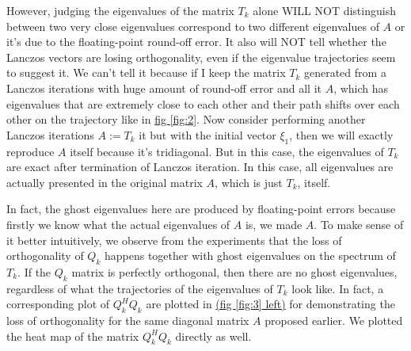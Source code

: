 \documentclass[]{article}
\theoremstyle{definition}
\begin{document}
            \par
            However, judging the eigenvalues of the matrix $T_k$ alone WILL NOT distinguish between two very close eigenvalues correspond to two different eigenvalues of $A$ or it's due to the floating-point round-off error. It also will NOT tell whether the Lanczos vectors are losing orthogonality, even if the eigenvalue trajectories seem to suggest it. We can't tell it because if I keep the matrix $T_k$ generated from a Lanczos iterations with huge amount of round-off error and all it $A$, which has eigenvalues that are extremely close to each other and their path shifts over each other on the trajectory like in \hyperref[fig:2]{fig \ref*{fig:2}}. Now consider performing another Lanczos iterations $A:=T_k$ it but with the initial vector $\xi_1$, then we will exactly reproduce $A$ itself because it's tridiagonal. But in this case, the eigenvalues of $T_k$ are exact after termination of Lanczos iteration. In this case, all eigenvalues are actually presented in the original matrix $A$, which is just $T_k$, itself. 
            \par
            In fact, the ghost eigenvalues here are produced by floating-point errors because firstly we know what the actual eigenvalues of $A$ is, we made $A$. To make sense of it better intuitively, we observe from the experiments that the loss of orthogonality of $Q_k$ happens together with ghost eigenvalues on the spectrum of $T_k$. If the $Q_k$ matrix is perfectly orthogonal, then there are no ghost eigenvalues, regardless of what the trajectories of the eigenvalues of $T_k$ look like. In fact, a corresponding plot of $Q_k^HQ_k$ are plotted in \hyperref[fig:3]{(fig \ref*{fig:3} left)} for demonstrating the loss of orthogonality for the same diagonal matrix $A$ proposed earlier. We plotted the heat map of the matrix $Q^H_kQ_k$ directly as well.
\end{document}
